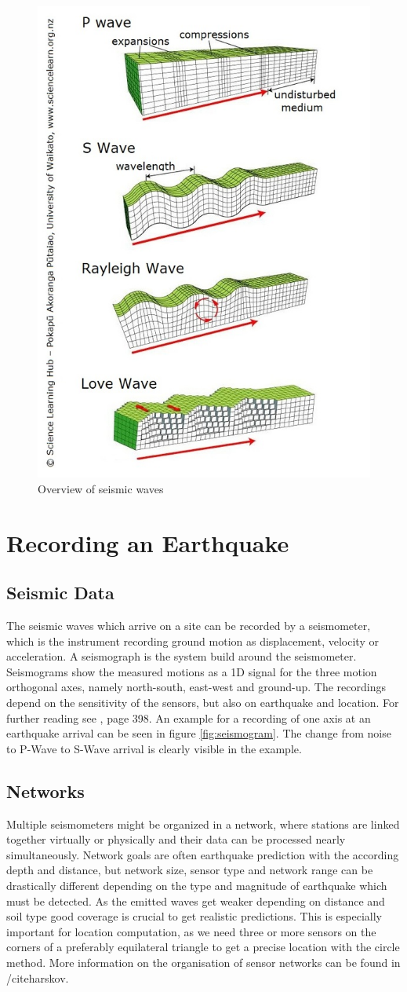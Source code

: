 \documentclass[thesis.tex]{subfiles}
\begin{document}
\begin{figure}[hb]
	\centering
	\includegraphics[width=0.6\linewidth]{../pictures/Prerequisites/waves.jpg}
	\caption{Overview of seismic waves}
	\label{fig:waves}
\end{figure}
\section{Recording an Earthquake}
\subsection{Seismic Data}
The seismic waves which arrive on a site can be recorded by a seismometer, which is the instrument recording ground motion as displacement, velocity or acceleration. A seismograph is the system build around the seismometer. Seismograms show the measured motions as a 1D signal for the three motion orthogonal axes, namely north-south, east-west and ground-up. The recordings depend on the sensitivity of the sensors, but also on earthquake and location. For further reading see \cite{IntroEarthquakes}, page 398. An example for a recording of one axis at an earthquake arrival can be seen in figure \ref{fig:seismogram}. The change from noise to P-Wave to S-Wave arrival is clearly visible in the example. 
\subsection{Networks}
Multiple seismometers might be organized in a network, where stations are linked together virtually or physically and their data can be processed nearly simultaneously. Network goals are often earthquake prediction with the according depth and distance, but network size, sensor type and network range can be drastically different depending on the type and magnitude of earthquake which must be detected. As the emitted waves get weaker depending on distance and soil type good coverage is crucial to get realistic predictions. This is especially important for location computation, as we need three or more sensors on the corners of a preferably equilateral triangle to get a precise location with the circle method. More information on the organisation of sensor networks can be found in /cite{harskov}.
\end{document}
